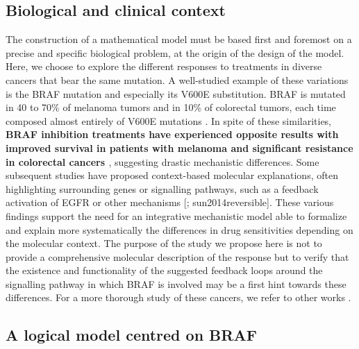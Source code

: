 \documentclass[a4paper,12pt,twoside,onecolumn,openright,final,oldfontcommands]{memoir}
\begin{document}
\subsection{Biological and clinical
context}\label{biological-and-clinical-context}

The construction of a mathematical model must be based first and
foremost on a precise and specific biological problem, at the origin of
the design of the model. Here, we choose to explore the different
responses to treatments in diverse cancers that bear the same mutation.
A well-studied example of these variations is the BRAF mutation and
especially its V600E substitution. BRAF is mutated in 40 to 70\% of
melanoma tumors and in 10\% of colorectal tumors, each time composed
almost entirely of V600E mutations \citep{cantwell2011brafv600e}. In
spite of these similarities, \textbf{BRAF inhibition treatments have
experienced opposite results with improved survival in patients with
melanoma \citep{chapman2011improved} and significant resistance in
colorectal cancers \citep{kopetz2010plx4032}}, suggesting drastic
mechanistic differences. Some subsequent studies have proposed
context-based molecular explanations, often highlighting surrounding
genes or signalling pathways, such as a feedback activation of EGFR
\citep{prahallad2012unresponsiveness} or other mechanisms
{[}\citet{poulikakos2011raf}; sun2014reversible{]}. These various
findings support the need for an integrative mechanistic model able to
formalize and explain more systematically the differences in drug
sensitivities depending on the molecular context. The purpose of the
study we propose here is not to provide a comprehensive molecular
description of the response but to verify that the existence and
functionality of the suggested feedback loops around the signalling
pathway in which BRAF is involved \citep{prahallad2012unresponsiveness}
may be a first hint towards these differences. For a more thorough study
of these cancers, we refer to other works
\citep{eduati2017drug, baur2020connecting, cho2016attractor}.

\subsection{A logical model centred on
BRAF}\label{a-logical-model-centred-on-braf}
\end{document}
